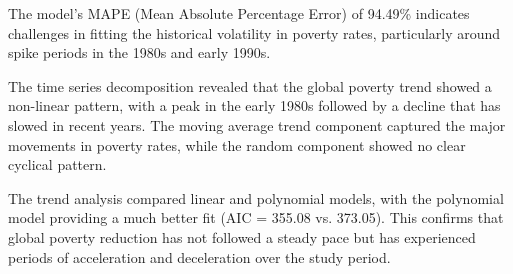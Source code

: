 \documentclass[12pt,a4paper]{article}
\begin{document}
The model's MAPE (Mean Absolute Percentage Error) of 94.49\% indicates challenges in fitting the historical volatility in poverty rates, particularly around spike periods in the 1980s and early 1990s.

The time series decomposition revealed that the global poverty trend showed a non-linear pattern, with a peak in the early 1980s followed by a decline that has slowed in recent years. The moving average trend component captured the major movements in poverty rates, while the random component showed no clear cyclical pattern.

The trend analysis compared linear and polynomial models, with the polynomial model providing a much better fit (AIC = 355.08 vs. 373.05). This confirms that global poverty reduction has not followed a steady pace but has experienced periods of acceleration and deceleration over the study period.
\end{document}
